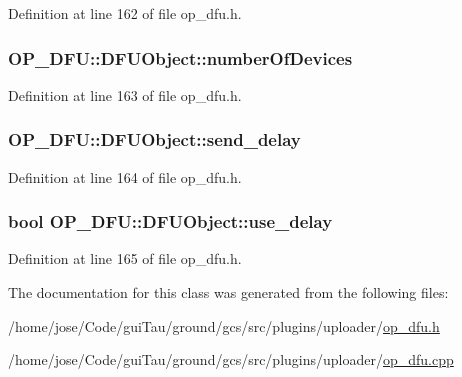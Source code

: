Definition at line 162 of file op\-\_\-dfu.\-h.

\hypertarget{class_o_p___d_f_u_1_1_d_f_u_object_a805f4ba165cc9592522fbc928d06c08d}{
\subsubsection[{number\-Of\-Devices}]{ O\-P\-\_\-\-D\-F\-U\-::\-D\-F\-U\-Object\-::number\-Of\-Devices}}\label{class_o_p___d_f_u_1_1_d_f_u_object_a805f4ba165cc9592522fbc928d06c08d}


Definition at line 163 of file op\-\_\-dfu.\-h.

\hypertarget{class_o_p___d_f_u_1_1_d_f_u_object_a0a420df742f4528dde9d22a28526a8f3}{
\subsubsection[{send\-\_\-delay}]{ O\-P\-\_\-\-D\-F\-U\-::\-D\-F\-U\-Object\-::send\-\_\-delay}}\label{class_o_p___d_f_u_1_1_d_f_u_object_a0a420df742f4528dde9d22a28526a8f3}


Definition at line 164 of file op\-\_\-dfu.\-h.

\hypertarget{class_o_p___d_f_u_1_1_d_f_u_object_a5e6ad3fb431eb0220a06c934b13ae276}{
\subsubsection[{use\-\_\-delay}]{\setlength{\rightskip}{0pt plus 5cm}bool O\-P\-\_\-\-D\-F\-U\-::\-D\-F\-U\-Object\-::use\-\_\-delay}}\label{class_o_p___d_f_u_1_1_d_f_u_object_a5e6ad3fb431eb0220a06c934b13ae276}


Definition at line 165 of file op\-\_\-dfu.\-h.



The documentation for this class was generated from the following files\-:\begin{DoxyCompactItemize}
\item 
/home/jose/\-Code/gui\-Tau/ground/gcs/src/plugins/uploader/\hyperlink{plugins_2uploader_2op__dfu_8h}{op\-\_\-dfu.\-h}\item 
/home/jose/\-Code/gui\-Tau/ground/gcs/src/plugins/uploader/\hyperlink{plugins_2uploader_2op__dfu_8cpp}{op\-\_\-dfu.\-cpp}\end{DoxyCompactItemize}
